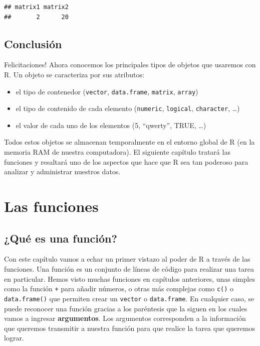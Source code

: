 \documentclass[
]{book}
\providecommand{\tightlist}{%
  \setlength{\itemsep}{0pt}\setlength{\parskip}{0pt}}
\begin{document}
\begin{verbatim}
## matrix1 matrix2 
##       2      20
\end{verbatim}

\hypertarget{conclusiuxf3n-3}{%
\section{Conclusión}\label{conclusiuxf3n-3}}

Felicitaciones! Ahora conocemos los principales tipos de objetos que usaremos con R. Un objeto se caracteriza por sus atributos:

\begin{itemize}
\tightlist
\item
  el tipo de contenedor (\texttt{vector}, \texttt{data.frame}, \texttt{matrix}, \texttt{array})
\item
  el tipo de contenido de cada elemento (\texttt{numeric}, \texttt{logical}, \texttt{character}, \ldots)
\item
  el valor de cada uno de los elementos (5, ``qwerty'', TRUE, \ldots)
\end{itemize}

Todos estos objetos se almacenan temporalmente en el entorno global de R (en la memoria RAM de nuestra computadora). El siguiente capítulo tratará las funciones y resaltará uno de los aspectos que hace que R sea tan poderoso para analizar y administrar nuestros datos.

\hypertarget{fonctions}{%
\chapter{Las funciones}\label{fonctions}}

\hypertarget{quuxe9-es-una-funciuxf3n}{%
\section{¿Qué es una función?}\label{quuxe9-es-una-funciuxf3n}}

Con este capítulo vamos a echar un primer vistazo al poder de R a través de las funciones. Una función es un conjunto de líneas de código para realizar una tarea en particular. Hemos visto muchas funciones en capítulos anteriores, unas simples como la función \texttt{+} para añadir números, o otras más complejas como \texttt{c()} o \texttt{data.frame()} que permiten crear un \texttt{vector} o \texttt{data.frame}. En cualquier caso, se puede reconocer una función gracias a los paréntesis que la siguen en los cuales vamos a ingresar \textbf{argumentos}. Los argumentos corresponden a la información que queremos transmitir a nuestra función para que realice la tarea que queremos lograr.
\end{document}
